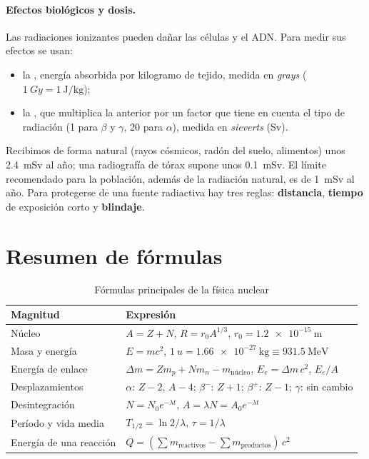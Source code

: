 \paragraph{Efectos biológicos y dosis.} Las radiaciones ionizantes pueden dañar las células y el ADN. Para medir sus efectos se usan:
\begin{itemize}
    \item la , energía absorbida por kilogramo de tejido, medida en \emph{grays} (\(\qty{1}{Gy} = \qty{1}{\joule\per\kg}\));
    \item la , que multiplica la anterior por un factor que tiene en cuenta el tipo de radiación (1 para \(\beta\)
    y \(\gamma\), 20 para \(\alpha\)), medida en \emph{sieverts} (\unit{Sv}).
\end{itemize}
Recibimos de forma natural (rayos cósmicos, radón del suelo, alimentos) unos \qty{2.4}{mSv} al año; una radiografía de tórax supone unos
\qty{0.1}{mSv}. El límite recomendado para la población, además de la radiación natural, es de \qty{1}{mSv} al año. Para protegerse de una
fuente radiactiva hay tres reglas: \textbf{distancia}, \textbf{tiempo} de exposición corto y \textbf{blindaje}.

\section{Resumen de fórmulas}\label{sec:nuc-resumen}

\begin{table}[H]
    \centering
    \caption{Fórmulas principales de la física nuclear}
    \vspace{-5pt}
    \begin{tabular}{@{}lL{10cm}@{}}
        \toprule
        \textbf{Magnitud} & \textbf{Expresión} \\
        \midrule
        Núcleo & \(A = Z + N\), \quad \(R = r_0 A^{1/3}\), \quad \(r_0 = \qty{1.2e-15}{\m}\) \\[3pt]
        Masa y energía & \(E = mc^2\), \quad \(\qty{1}{u} = \qty{1.66e-27}{\kg} \equiv \qty{931.5}{\mega\electronvolt}\) \\[3pt]
        Energía de enlace & \(\Delta m = Z m_p + N m_n - m_{\text{núcleo}}\), \quad \(E_e = \Delta m\,c^2\), \quad \(E_e/A\) \\[3pt]
        Desplazamientos & \(\alpha\): \(Z - 2\), \(A - 4\); \quad \(\beta^-\): \(Z + 1\); \quad \(\beta^+\): \(Z - 1\); \quad \(\gamma\): sin cambio \\[3pt]
        Desintegración & \(N = N_0 e^{-\lambda t}\), \quad \(A = \lambda N = A_0 e^{-\lambda t}\) \\[3pt]
        Período y vida media & \(T_{1/2} = \ln 2/\lambda\), \quad \(\tau = 1/\lambda\) \\[3pt]
        Energía de una reacción & \(Q = (\sum m_{\text{reactivos}} - \sum m_{\text{productos}})\,c^2\) \\
        \bottomrule
    \end{tabular}
    \label{tab:nuc-resumen}
\end{table}


